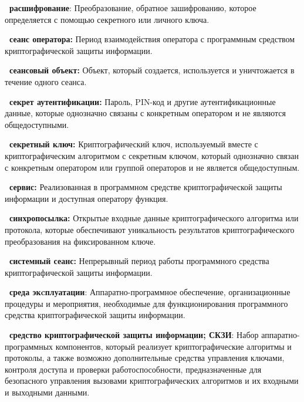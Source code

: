 {\bf \thedefctr~расшифрование}:
Преобразование, обратное зашифрованию, которое определяется с помощью
секретного или личного ключа.


{\bf \thedefctr~сеанс оператора:}
Период взаимодействия оператора с программным средством криптографической
защиты информации.

{\bf \thedefctr~сеансовый объект:}
Объект, который создается, 
используется и уничтожается в течение одного сеанса.

{\bf \thedefctr~секрет аутентификации:}
Пароль, PIN-код и другие аутентификационные данные, 
которые однозначно связаны с конкретным оператором 
и не являются общедоступными.

{\bf \thedefctr~секретный ключ:}
Криптографический ключ, используемый
вместе с криптографическим алгоритмом с секретным ключом, 
который однозначно связан с конкретным оператором 
или группой операторов и не является общедоступным.


{\bf \thedefctr~сервис:}
Реализованная в программном средстве криптографической защиты информации 
и доступная оператору функция.

{\bf \thedefctr~синхропосылка:}
Открытые входные данные криптографического алгоритма или протокола,
которые обеспечивают уникальность результатов 
криптографического преобразования на фиксированном ключе.


{\bf \thedefctr~системный сеанс:}
Непрерывный период работы программного средства криптографической 
защиты информации.

{\bf \thedefctr~среда экcплуатации}:
Аппаратно-программное обеспечение, 
организационные процедуры и мероприятия, 
необходимые для функционирования 
программного средства криптографической защиты информации.

{\bf \thedefctr~средство криптографической защиты информации;
СКЗИ}:
Набор аппа\-ратно-программных компонентов, 
который реализует криптографические алгоритмы и протоколы,
а также возможно дополнительные средства управления ключами,
контроля доступа и проверки работоспособности, 
предназначенные для безопасного управления вызовами
криптографических алгоритмов и их входными и выходными данными.

